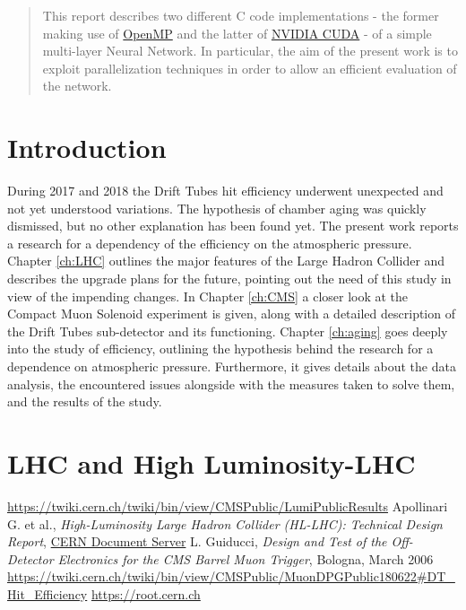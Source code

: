 \documentclass[12pt,twoside,a4paper]{report}
\numberwithin{equation}{section}
\begin{document}
\hypersetup{pageanchor=false}

\newpage\null\thispagestyle{empty}\newpage
\begin{abstract}
This report describes two different C code implementations - the former making use of \href{https://www.openmp.org/}{OpenMP} and the latter of \href{https://developer.nvidia.com/cuda-zone}{NVIDIA CUDA} - of a simple multi-layer Neural Network. In particular, the aim of the present work is to exploit parallelization techniques in order to allow an efficient evaluation of the network.

\end{abstract}
\newpage\null\thispagestyle{empty}\newpage
\tableofcontents

\newpage\null\thispagestyle{empty}\newpage
{}
\chapter*{Introduction}
During 2017 and 2018 the Drift Tubes hit efficiency underwent unexpected and not yet understood variations. The hypothesis of chamber aging was quickly dismissed, but no other explanation has been found yet.
The present work reports a research for a dependency of the efficiency on the atmospheric pressure.
Chapter \ref{ch:LHC} outlines the major features of the Large Hadron Collider and describes the upgrade plans for the future, pointing out the need of this study in view of the impending changes.
In Chapter \ref{ch:CMS} a closer look at the Compact Muon Solenoid experiment is given, along with a detailed description of the Drift Tubes sub-detector and its functioning.
Chapter \ref{ch:aging} goes deeply into the study of efficiency, outlining the hypothesis behind the research for a dependence on atmospheric pressure. Furthermore, it gives details about the data analysis, the encountered issues alongside with the measures taken to solve them, and the results of the study.


\newpage\null\thispagestyle{empty}\newpage
\chapter{LHC and High Luminosity-LHC}

\begin{thebibliography}{200}
 \url{https://twiki.cern.ch/twiki/bin/view/CMSPublic/LumiPublicResults}
 Apollinari G. et al., \textit{High-Luminosity Large Hadron Collider (HL-LHC): Technical Design Report}, \href{<http://cds.cern.ch/record/2284929/files/40-39-PB.pdf?version=1>}{CERN Document Server}
 L. Guiducci, \textit{Design and Test of the Off-Detector Electronics for the CMS Barrel Muon Trigger}, Bologna, March 2006
 \url{https://twiki.cern.ch/twiki/bin/view/CMSPublic/MuonDPGPublic180622#DT_Hit_Efficiency}
 \url{https://root.cern.ch}

\end{thebibliography}
\end{document}
